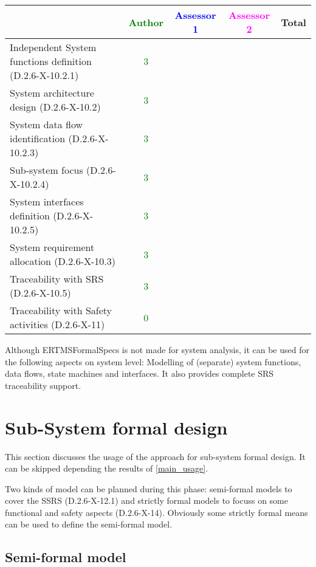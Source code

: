 \begin{tabular}{|l | c | c | c | c|}
\hline
& \textcolor{green}{Author} & \textcolor{blue}{Assessor 1} & \textcolor{magenta}{Assessor 2} & Total \\
\hline
Independent System functions definition (D.2.6-X-10.2.1)  & \textcolor{green}{3} & & &  \\
\hline 
System architecture design (D.2.6-X-10.2) & \textcolor{green}{3} & & &  \\
\hline
System data flow identification (D.2.6-X-10.2.3)  & \textcolor{green}{3} & & &  \\
\hline
Sub-system focus (D.2.6-X-10.2.4)  & \textcolor{green}{3} & & &  \\
\hline
System interfaces definition (D.2.6-X-10.2.5)  & \textcolor{green}{3} & & &  \\
\hline
System requirement allocation (D.2.6-X-10.3)  & \textcolor{green}{3} & & &  \\
\hline
Traceability with SRS (D.2.6-X-10.5)  & \textcolor{green}{3} & & &  \\
\hline
Traceability with Safety activities (D.2.6-X-11)  & \textcolor{green}{0} & & &  \\
\hline
\end{tabular}

\begin{author_comment}
Although ERTMSFormalSpecs is not made for system analysis, it can be used for the following aspects on system level: Modelling of (separate) system functions, data flows, state machines and interfaces. It also provides complete SRS traceability support.  
\end{author_comment}


\section{Sub-System formal design}
This section discusses the usage of the approach for sub-system formal design.
It can be skipped depending the results of \ref{main_usage}.

Two kinds of model can be planned during this phase: semi-formal models to  cover the SSRS (D.2.6-X-12.1) and strictly formal  models to  focuss on some functional and safety aspects (D.2.6-X-14).  Obviously some strictly  formal means can be used to define the semi-formal  model.

\subsection{Semi-formal model}

